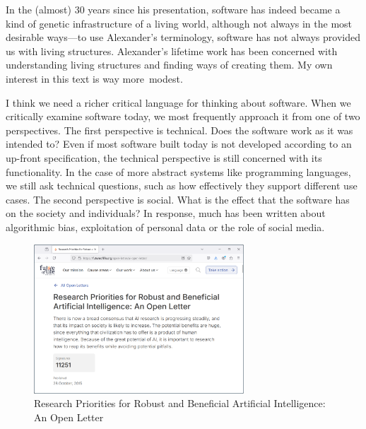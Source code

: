 In the (almost) 30 years since his presentation, software has indeed became a kind of genetic
infrastructure of a living world, although not always in the most desirable ways---to use
Alexander's terminology, software has not always provided us with living structures.
Alexander's lifetime work has been concerned with understanding living structures and finding
ways of creating them. My own interest in this text is way more~modest.

I think we need a richer critical language for thinking about software. When we critically
examine software today, we most frequently approach it from one of two perspectives.
The first perspective is technical. Does the software work as it was intended to? Even if
most software built today is not developed according to an up-front specification, the technical
perspective is still concerned with its functionality. In the case of more abstract systems
like programming languages, we still ask technical questions, such as how effectively they support
different use cases. The second perspective is social. What is the effect that the software has on
the society and individuals? In response, much has been written about algorithmic bias, exploitation
of personal data or the role of social media.

\begin{figure}
\centering
\vspace{-1em}
\includegraphics[width=0.7\textwidth]{fig/ai.png}
\caption{Research Priorities for Robust and Beneficial Artificial Intelligence: An Open Letter}
\label{fig:ai}
\end{figure}

